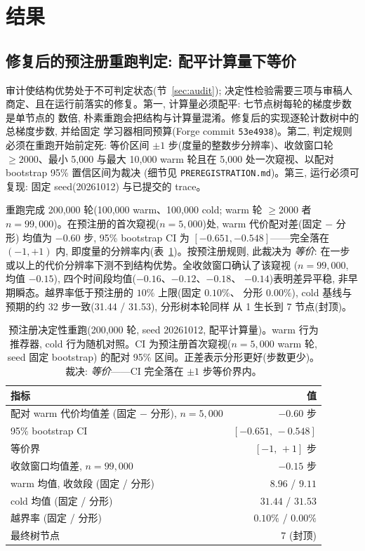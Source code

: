 \documentclass[11pt]{article}
\begin{document}
\section{结果}

\subsection{修复后的预注册重跑判定: 配平计算量下等价}

审计使结构优势处于不可判定状态(节~\ref{sec:audit}); 决定性检验需要三项与审稿人
商定、且在运行前落实的修复。第一, 计算量必须配平: 七节点树每轮的梯度步数是单节点的
数倍, 朴素重跑会把结构与计算量混淆。修复后的实现逐轮计数树中的总梯度步数, 并给固定
学习器相同预算(Forge commit \texttt{53e4938})。第二, 判定规则必须在重跑开始前定死:
等价区间 $\pm 1$ 步(度量的整数步分辨率)、收敛窗口轮 $\ge 2000$、最小 5,000 与最大
10,000 warm 轮且在 5,000 处一次窥视、以配对 bootstrap 95\% 置信区间为裁决
(细节见 \texttt{PREREGISTRATION.md})。第三, 运行必须可复现: 固定 seed(20261012)
与已提交的 trace。

重跑完成 200,000 轮(100,000 warm、100,000 cold; warm 轮 $\ge 2000$ 者
$n=99{,}000$)。在预注册的首次窥视($n=5{,}000$)处, warm 代价配对差(固定 $-$ 分形)
均值为 $-0.60$ 步, 95\% bootstrap CI 为 $[-0.651,-0.548]$——完全落在
$(-1,+1)$ 内, 即度量的分辨率内(表~\ref{tab:rerun})。按预注册规则, 此裁决为
\emph{等价}: 在一步或以上的代价分辨率下测不到结构优势。全收敛窗口确认了该窥视
($n=99{,}000$, 均值 $-0.15$), 四个时间段均值($-0.16$、$-0.12$、$-0.18$、
$-0.14$)表明差异平稳, 非早期瞬态。越界率低于预注册的 $10\%$ 上限(固定 $0.10\%$、
分形 $0.00\%$), cold 基线与预期的约 32 步一致(31.44 / 31.53), 分形树本轮同样
从 1 生长到 7 节点(封顶)。

\begin{table}[t]
\centering
\caption{预注册决定性重跑(200,000 轮, seed 20261012, 配平计算量)。warm 行为推荐器,
cold 行为随机对照。CI 为预注册首次窥视($n=5{,}000$ warm 轮, seed 固定 bootstrap)
的配对 95\% 区间。正差表示分形更好(步数更少)。裁决: \emph{等价}——CI 完全落在
$\pm 1$ 步等价界内。}
\label{tab:rerun}
\begin{tabular}{lr}
\toprule
指标 & 值 \\
\midrule
配对 warm 代价均值差 (固定 $-$ 分形), $n{=}5{,}000$ & $-0.60$ 步 \\
95\% bootstrap CI & $[-0.651,\,-0.548]$ \\
等价界 & $[-1,\,+1]$ 步 \\
收敛窗口均值差, $n{=}99{,}000$ & $-0.15$ 步 \\
warm 均值, 收敛段 (固定 / 分形) & $8.96$ / $9.11$ \\
cold 均值 (固定 / 分形) & $31.44$ / $31.53$ \\
越界率 (固定 / 分形) & $0.10\%$ / $0.00\%$ \\
最终树节点 & 7 (封顶) \\
\bottomrule
\end{tabular}
\end{table}
\end{document}
